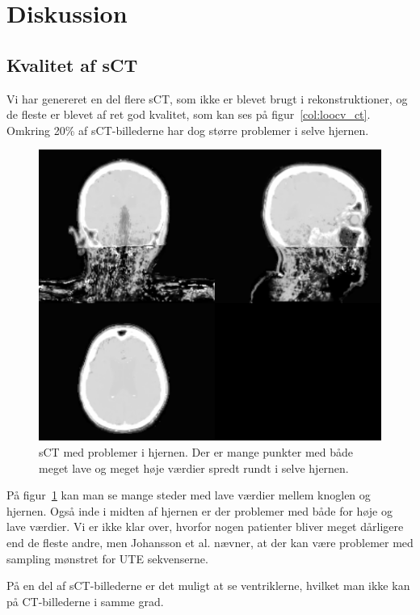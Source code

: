 \section{Diskussion}

\subsection{Kvalitet af sCT}


Vi har genereret en del flere sCT, som ikke er blevet brugt i rekonstruktioner,  og de fleste er blevet af ret god kvalitet, som kan ses på figur~\ref{col:loocv_ct}. Omkring 20\% af sCT-billederne har dog større problemer i selve hjernen.

\begin{figure}[H]
   \includegraphics[width=\textwidth]{billeder/sct_problemer.png}
   \caption{sCT med problemer i hjernen. Der er mange punkter med både meget lave og meget høje værdier spredt rundt i selve hjernen.}
   \label{sct_problemer}
\end{figure}

På figur~\ref{sct_problemer} kan man se mange steder med lave værdier mellem knoglen og hjernen. Også inde i midten af hjernen er der problemer med både for høje og lave værdier. Vi er ikke klar over, hvorfor nogen patienter bliver meget dårligere end de fleste andre, men Johansson et al. nævner, at der kan være problemer med sampling mønstret for UTE sekvenserne.

På en del af sCT-billederne er det muligt at se ventriklerne, hvilket man ikke kan på CT-billederne i samme grad.

